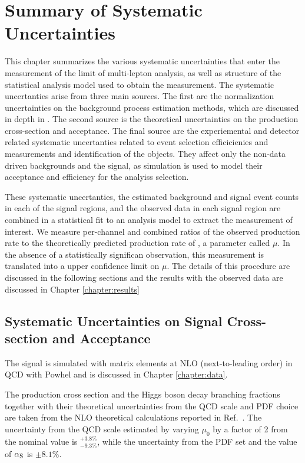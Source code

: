 \chapter[Summary of Systematic Uncertanties][Summary of Systematic Uncertainties]{Summary of Systematic Uncertainties}
\label{chapter:systematics} 

This chapter summarizes the various systematic uncertainties that enter the measurement of the limit of \tth multi-lepton analysis, as well as structure of the statistical 
analysis model used to obtain the measurement. The systematic uncertanties arise
from three main sources. The first are the normalization uncertainties on the background process estimation methods, which are discussed in depth in \label{chapter:backgrounds}. 
The second source is the theoretical uncertainties on the \tth production cross-section and acceptance. The final source are the experiemental and detector related systematic
uncertanties related to event selection efficicienies and measurements and identification of the objects. They affect only the non-data driven backgrounds and the \tth
signal, as simulation is used to model their acceptance and efficiency for the analyiss selection. 

These systematic uncertanties, the estimated background and signal event counts in each of the signal regions, and the observed data in each signal region are combined
in a statistical fit to an analysis model to extract the measurement of interest. We measure per-channel and combined ratios of the observed production rate to the 
theoretically predicted production rate of \tth, a parameter called $\mu$. In the absence of a statistically significan observation, this measurement is translated into a upper confidence limit
on $\mu$. The details of this procedure are discussed in the following sections and the results with the observed data are discussed in Chapter \ref{chapter:results}

\section{Systematic Uncertainties on Signal Cross-section and Acceptance}
\label{section:tth}
The \tth signal is simulated with matrix elements at NLO (next-to-leading order) in QCD with {\textsc Powhel} and is discussed in Chapter \ref{chapter:data}.  

The production cross section and the Higgs boson decay branching fractions together with their theoretical uncertainties from the QCD scale and PDF choice are taken from the NLO theoretical calculations reported in Ref.~\cite{Heinemeyer:2013tqa}. The uncertainty from the QCD scale estimated by varying $\mu_{0}$ by a factor of 2 from the nominal value is $^{+3.8\%}_{-9.3\%}$, while the uncertainty from the PDF set and the value of $\alpha_{\rm S}$ is $\pm 8.1\%$.\\

